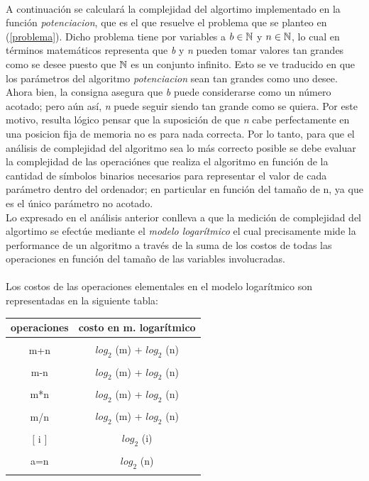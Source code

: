 \paragraph{}
A continuación se calculará la complejidad del algortimo implementado en la función \textit{potenciacion}, que es el que resuelve el problema que se planteo en (\ref{problema}). Dicho problema tiene por variables a $b \in \mathbb{N}$ y $n \in \mathbb{N}$, lo cual en términos matemáticos representa que \textit{b} y \textit{n} pueden tomar valores tan grandes como se desee puesto que $\mathbb{N}$ es un conjunto infinito. Esto se ve traducido en que los parámetros del algoritmo \textit{potenciacion} sean tan grandes como uno desee. \\
Ahora bien, la consigna asegura que \textit{b} puede considerarse como un número acotado; pero aún así, \textit{n} puede seguir siendo tan grande como se quiera. Por este motivo, resulta lógico pensar que la suposición de que \textit{n} cabe perfectamente en una posicion fija de memoria no es para nada correcta. Por lo tanto, para que el análisis de complejidad del algoritmo sea lo más correcto posible se debe evaluar la complejidad de las operaciónes que realiza el algoritmo en función de la cantidad de símbolos binarios necesarios para representar el valor de cada parámetro dentro del ordenador; en particular en función del tamaño de n, ya que es el único parámetro no acotado.\\
Lo expresado en el análisis anterior conlleva a que la medición de complejidad del algortimo se efectúe mediante el \textit{modelo logarítmico} el cual precisamente mide la performance de un algoritmo a través de la suma de los costos de todas las operaciones en función del tamaño de las variables involucradas.

\paragraph{}
Los costos de las operaciones elementales en el modelo logarítmico son representadas en la siguiente tabla: \\
	\begin{center}
		\begin{tabular}{|c|c|}
			\hline
			operaciones & costo en m. logarítmico \\ 
			\hline
			& \\
			m+n & $log_2$ (m) + $log_2$ (n) \\
			& \\
			m-n & $log_2$ (m) + $log_2$ (n) \\
			& \\
			m*n & $log_2$ (m) + $log_2$ (n) \\
			& \\
			m/n & $log_2$ (m) + $log_2$ (n) \\
			& \\
			$[$ i $]$ & $log_2$ (i) \\
			& \\
			a=n & $log_2$ (n) \\
			& \\
			\hline
		\end{tabular} 
	\end{center}

